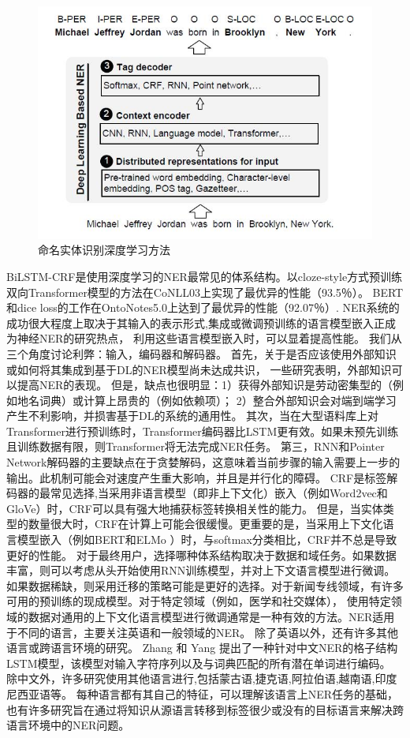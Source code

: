  \begin{figure}[htbp]
  \centering
  \includegraphics[scale=0.8]{./images/nerDL.jpg}
  \caption{命名实体识别深度学习方法}
  \label{fig:nerDL}
\end{figure}

BiLSTM-CRF是使用深度学习的NER最常见的体系结构。以cloze-style方式预训练双向Transformer模型的方法在CoNLL03上实现了最优异的性能（93.5％）\cite{baevski2019cloze}。 
BERT和dice loss的工作在OntoNotes5.0上达到了最优异的性能（92.07％）\cite{li2019dice}.
NER系统的成功很大程度上取决于其输入的表示形式,集成或微调预训练的语言模型嵌入正成为神经NER的研究热点，
利用这些语言模型嵌入时，可以显着提高性能。
我们从三个角度讨论利弊：输入，编码器和解码器。
首先，关于是否应该使用外部知识或如何将其集成到基于DL的NER模型尚未达成共识，
一些研究表明，外部知识可以提高NER的表现。
但是，缺点也很明显：1）获得外部知识是劳动密集型的（例如地名词典）或计算上昂贵的（例如依赖项）； 2）整合外部知识会对端到端学习产生不利影响，并损害基于DL的系统的通用性。
其次，当在大型语料库上对Transformer进行预训练时，Transformer编码器比LSTM更有效。如果未预先训练且训练数据有限，则Transformer将无法完成NER任务\cite{guo2019star,yan2019tener}。
第三，RNN和Pointer Network解码器的主要缺点在于贪婪解码，这意味着当前步骤的输入需要上一步的输出。此机制可能会对速度产生重大影响，并且是并行化的障碍。 
CRF是标签解码器的最常见选择,当采用非语言模型（即非上下文化）嵌入（例如Word2vec和GloVe）时，CRF可以具有强大地捕获标签转换相关性的能力。
但是，当实体类型的数量很大时，CRF在计算上可能会很缓慢。更重要的是，当采用上下文化语言模型嵌入（例如BERT和ELMo ）时，与softmax分类相比，CRF并不总是导致更好的性能。
对于最终用户，选择哪种体系结构取决于数据和域任务。如果数据丰富，则可以考虑从头开始使用RNN训练模型，并对上下文语言模型进行微调。
如果数据稀缺，则采用迁移的策略可能是更好的选择。对于新闻专线领域，有许多可用的预训练的现成模型。对于特定领域（例如，医学和社交媒体），
使用特定领域的数据对通用的上下文化语言模型进行微调通常是一种有效的方法。NER适用于不同的语言，主要关注英语和一般领域的NER。
除了英语以外，还有许多其他语言或跨语言环境的研究。
 Zhang 和 Yang 提出了一种针对中文NER的格子结构LSTM模型，该模型对输入字符序列以及与词典匹配的所有潜在单词进行编码\cite{zhang2018chinese}。
 除中文外，许多研究使用其他语言进行,包括蒙古语,捷克语,阿拉伯语,越南语,印度尼西亚语等。
 每种语言都有其自己的特征，可以理解该语言上NER任务的基础，也有许多研究旨在通过将知识从源语言转移到标签很少或没有的目标语言来解决跨语言环境中的NER问题。


